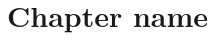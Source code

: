 \documentclass[../../main.tex]{subfiles}
\begin{document}
\chapter{Chapter name}
\label{subfile_id:cha:name_of_chapter}


\lipsum[1]
\end{document}
